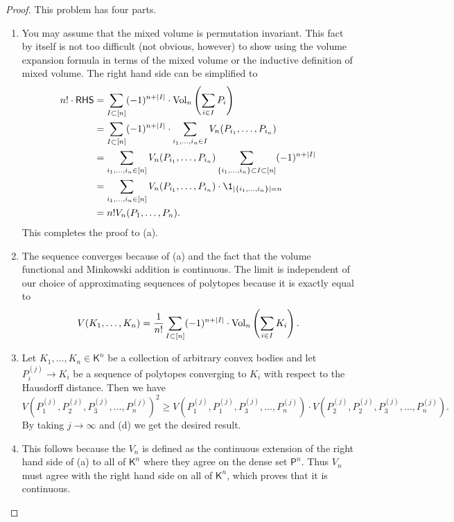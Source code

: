 \documentclass[12pt]{article}
\begin{document}
\begin{proof}
	This problem has four parts. 
	\begin{enumerate}[label = (\alph*)]
		\item You may assume that the mixed volume is permutation invariant. This fact by itself is not too difficult (not obvious, however) to show using the volume expansion formula in terms of the mixed volume or the inductive definition of mixed volume. The right hand side can be simplified to  
		\begin{align*}
			n! \cdot \mathsf{RHS} & = \sum_{I \subset [n]} (-1)^{n + |I|} \cdot \Vol_n \left ( \sum_{i \in I} P_i \right ) \\
			& = \sum_{I \subset [n]} (-1)^{n + |I|} \cdot \sum_{i_1, \ldots, i_n \in I} V_n(P_{i_1}, \ldots, P_{i_n}) \\
			& = \sum_{i_1, \ldots, i_n \in [n]} V_n(P_{i_1}, \ldots, P_{i_n}) \sum_{\{i_1, \ldots, i_n\} \subset I \subset [n]} (-1)^{n + |I|} \\
			& = \sum_{i_1, \ldots, i_n \in [n]} V_n(P_{i_1}, \ldots, P_{i_n}) \cdot \1_{|\{i_1, \ldots, i_n\}| = n} \\
			& = n! V_n(P_1, \ldots, P_n). 
		\end{align*}
		This completes the proof to (a). 

		\item The sequence converges because of (a) and the fact that the volume functional and Minkowski addition is continuous. The limit is independent of our choice of approximating sequences of polytopes because it is exactly equal to 
		\[
			V(K_1, \ldots, K_n) = \frac{1}{n!} \sum_{I \subset [n]} (-1)^{n + |I|} \cdot \operatorname{Vol}_n \left ( \sum_{i \in I} K_i \right ). 
		\]

		\item Let $K_1, \ldots, K_n \in \mathsf{K}^n$ be a collection of arbitrary convex bodies and let $P_i^{(j)} \to K_i$ be a sequence of polytopes converging to $K_i$ with respect to the Hausdorff distance. Then we have 
		\[
			V(P_1^{(j)}, P_2^{(j)}, P_3^{(j)}, \ldots, P_n^{(j)})^2 \geq V(P_1^{(j)}, P_1^{(j)}, P_3^{(j)}, \ldots, P_n^{(j)}) \cdot V(P_2^{(j)}, P_2^{(j)}, P_3^{(j)}, \ldots, P_n^{(j)}).
		\]
		By taking $j \to \infty$ and (d) we get the desired result. 

		\item This follows because the $V_n$ is defined as the continuous extension of the right hand side of (a) to all of $\mathsf{K}^n$ where they agree on the dense set $\mathsf{P}^n$. Thus $V_n$ must agree with the right hand side on all of $\mathsf{K}^n$, which proves that it is continuous. 
	\end{enumerate}
\end{proof}
\end{document}
